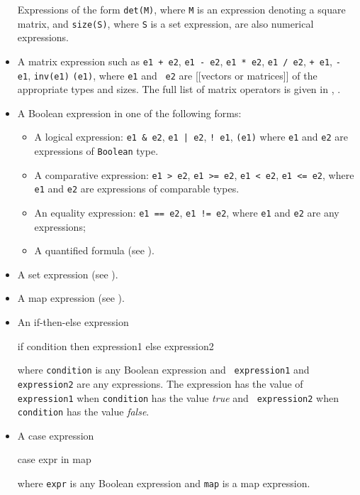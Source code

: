 \documentclass[12pt]{article}
\begin{document}
\begin{itemize}
  Expressions of the form {\tt det(M)}, where {\tt M} is an expression
  denoting a square matrix, and {\tt size(S)}, where {\tt S} is a set
  expression, are also numerical expressions.
\item A matrix expression such as \texttt{e1 + e2}, \texttt{e1 - e2},
  \texttt{e1 * e2}, \texttt{e1 / e2},  \texttt{+ e1},
  \texttt{- e1}, {\tt inv(e1)} \texttt{(e1)}, where {\tt e1} and {\tt
    e2} are [[vectors or matrices]] of the appropriate types and
  sizes. The full list of matrix
  operators is given in ,
  .
\item A Boolean expression in one of the following forms:
\begin{itemize}
\item A logical expression: \texttt{e1 \& e2}, \texttt{e1 | e2}, \texttt{! e1}, \texttt{(e1)} where 
\texttt{e1} and \texttt{e2} are expressions of {\tt Boolean} type.
\item A comparative expression: \texttt{e1 > e2}, \texttt{e1 >= e2}, \texttt{e1 < e2}, \texttt{e1 <= e2}, where \texttt{e1} and \texttt{e2} are expressions of comparable types.
\item An equality expression: \texttt{e1 == e2}, \texttt{e1 != e2}, where \texttt{e1} and \texttt{e2} are any expressions;
\item A quantified formula (see ).
\end{itemize}
\item A set expression (see ).
\item A map expression (see ).
\item An if-then-else expression
      \begin{blogcode}if condition then expression1 else expression2\end{blogcode}
     where {\tt condition} is any Boolean expression and {\tt
       expression1} and {\tt expression2} are any expressions.
     The expression has the value of {\tt
       expression1} when {\tt condition} has the value {\it true}
     and {\tt
       expression2} when {\tt condition} has the value {\it false}.
\item A case expression
      \begin{blogcode}case expr in map\end{blogcode}
     where {\tt expr} is any Boolean expression and {\tt map} is a map
     expression.

\end{itemize}
\end{document}
